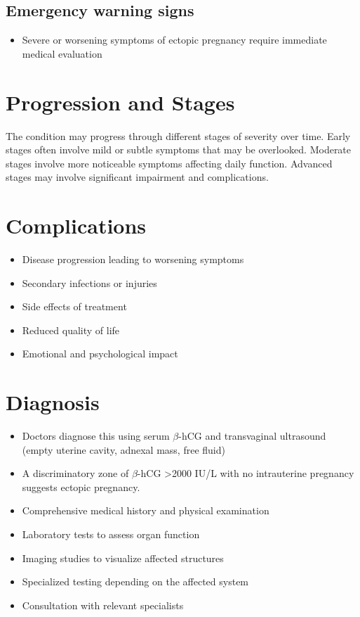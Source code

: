 \subsection{Emergency warning signs}
\begin{itemize}[noitemsep]
  \item Severe or worsening symptoms of ectopic pregnancy require immediate medical evaluation
\end{itemize}
\section{Progression and Stages}
The condition may progress through different stages of severity over time. Early stages often involve mild or subtle symptoms that may be overlooked. Moderate stages involve more noticeable symptoms affecting daily function. Advanced stages may involve significant impairment and complications.
\section{Complications}
\begin{itemize}[noitemsep]
  \item Disease progression leading to worsening symptoms
  \item Secondary infections or injuries
  \item Side effects of treatment
  \item Reduced quality of life
  \item Emotional and psychological impact
\end{itemize}
\section{Diagnosis}
\begin{itemize}[noitemsep]
  \item Doctors diagnose this using serum $\beta$-hCG and transvaginal ultrasound (empty uterine cavity, adnexal mass, free fluid)
  \item A discriminatory zone of $\beta$-hCG >2000 IU/L with no intrauterine pregnancy suggests ectopic pregnancy.
  \item Comprehensive medical history and physical examination
  \item Laboratory tests to assess organ function
  \item Imaging studies to visualize affected structures
  \item Specialized testing depending on the affected system
  \item Consultation with relevant specialists
\end{itemize}
